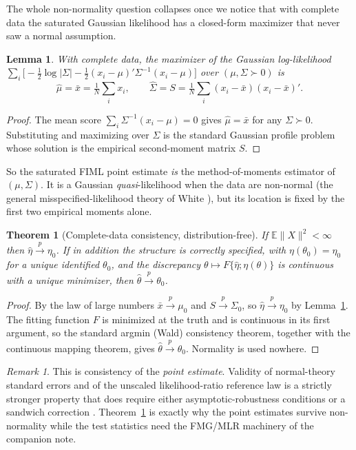 \documentclass[11pt]{article}
\newcommand{\E}{\mathbb{E}}
\theoremstyle{plain}
\newtheorem{theorem}{Theorem}
\newtheorem{lemma}{Lemma}
\theoremstyle{remark}
\newtheorem*{remark}{Remark}
\begin{document}
The whole non-normality question collapses once we notice that with complete
data the saturated Gaussian likelihood has a closed-form maximizer that never
saw a normal assumption.

\begin{lemma}\label{lem:sat}
With complete data, the maximizer of the Gaussian log-likelihood
$\sum_i\big[-\tfrac12\log|\Sigma|-\tfrac12(x_i-\mu)'\Sigma^{-1}(x_i-\mu)\big]$
over $(\mu,\Sigma\succ0)$ is
\[
  \hat\mu = \bar x = \tfrac1N\textstyle\sum_i x_i,
  \qquad
  \hat\Sigma = S = \tfrac1N\textstyle\sum_i (x_i-\bar x)(x_i-\bar x)'.
\]
\end{lemma}

\begin{proof}
The mean score $\sum_i\Sigma^{-1}(x_i-\mu)=0$ gives $\hat\mu=\bar x$ for any
$\Sigma\succ0$. Substituting and maximizing over $\Sigma$ is the standard
Gaussian profile problem whose solution is the empirical second-moment matrix
$S$.
\end{proof}

So the saturated FIML point estimate \emph{is} the method-of-moments estimator
of $(\mu,\Sigma)$. It is a Gaussian \emph{quasi}-likelihood when the data are
non-normal (the general misspecified-likelihood theory of White
\cite{white1982}), but its location is fixed by the first two empirical moments
alone.

\begin{theorem}[Complete-data consistency, distribution-free]\label{thm:complete}
If $\E\lVert X\rVert^2<\infty$ then $\hat\eta\xrightarrow{p}\eta_0$. If in
addition the structure is correctly specified, with $\eta(\theta_0)=\eta_0$ for a
unique identified $\theta_0$, and the discrepancy
$\theta\mapsto F\{\hat\eta;\eta(\theta)\}$ is continuous with a unique minimizer,
then $\hat\theta\xrightarrow{p}\theta_0$.
\end{theorem}

\begin{proof}
By the law of large numbers $\bar x\xrightarrow{p}\mu_0$ and
$S\xrightarrow{p}\Sigma_0$, so $\hat\eta\xrightarrow{p}\eta_0$ by
Lemma~\ref{lem:sat}. The fitting function $F$ is minimized at the truth and is
continuous in its first argument, so the standard argmin (Wald) consistency
theorem, together with the continuous mapping theorem, gives
$\hat\theta\xrightarrow{p}\theta_0$. Normality is used nowhere.
\end{proof}

\begin{remark}
This is consistency of the \emph{point estimate}. Validity of normal-theory
standard errors and of the unscaled likelihood-ratio reference law is a strictly
stronger property that does require either asymptotic-robustness conditions
\cite{browne1984,andersonamemiya1988} or a sandwich correction
\cite{white1982}. Theorem~\ref{thm:complete} is exactly why the point estimates
survive non-normality while the test statistics need the FMG/MLR machinery of
the companion note.
\end{remark}
\end{document}
